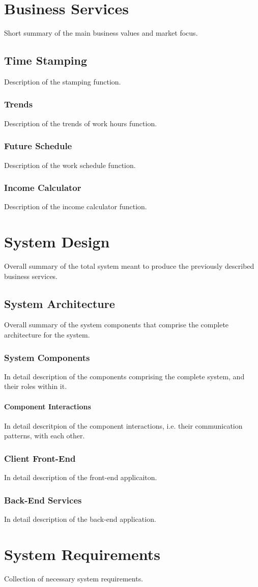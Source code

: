 \documentclass{report}
\begin{document}
\chapter{Business Services}
Short summary of the main business values and market focus.

\section{Time Stamping}
Description of the stamping function.

\subsection{Trends}
Description of the trends of work hours function.

\subsection{Future Schedule}
Description of the work schedule function.

\subsection{Income Calculator}
Description of the income calculator function.

\chapter{System Design}
Overall summary of the total system meant to produce the previously described business services.

\section{System Architecture}
Overall summary of the system components that comprise the complete architecture for the system.

\subsection{System Components}
In detail description of the components comprising the complete system, and their roles within it.

\subsubsection{Component Interactions}
In detail descritpion of the component interactions, i.e. their communication patterns, with each other.

\subsection{Client Front-End}
In detail description of the front-end applicaiton.

\subsection{Back-End Services}
In detail description of the back-end application.

\chapter{System Requirements}
Collection of necessary system requirements.
\end{document}
